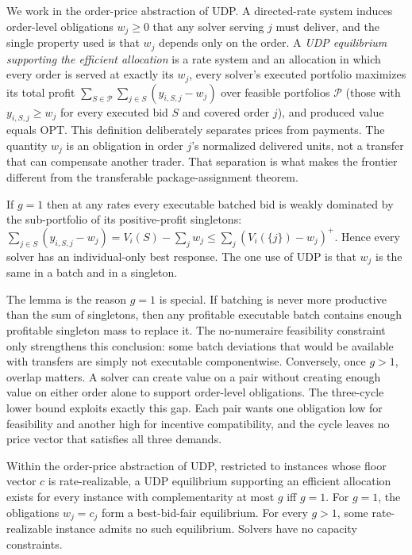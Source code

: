 \documentclass{llncs}
\newcommand{\OPT}{\mathrm{OPT}}
\begin{document}
We work in the order-price abstraction of UDP. A directed-rate system
induces order-level obligations $w_j\ge0$ that any solver serving $j$
must deliver, and the single property used is that $w_j$ depends only on
the order. A \emph{UDP equilibrium supporting the efficient allocation}
is a rate system and an allocation in which every order is served at
exactly its $w_j$, every solver's executed portfolio maximizes its
total profit
$\sum_{S\in\mathcal P}\sum_{j\in S}(y_{i,S,j}-w_j)$ over feasible
portfolios $\mathcal P$ (those with $y_{i,S,j}\ge w_j$ for every
executed bid $S$ and covered order $j$), and produced value equals
$\OPT$.
This definition deliberately separates prices from payments. The quantity $w_j$ is an
obligation in order $j$'s normalized delivered units, not a transfer that
can compensate another trader. That separation is what makes the
frontier different from the transferable package-assignment theorem.

\begin{lemma}[Batch domination under $g=1$]\label{lem:domination}
If $g=1$ then at any rates every executable batched bid is weakly
dominated by the sub-portfolio of its positive-profit singletons:
$\sum_{j\in S}(y_{i,S,j}-w_j)=V_i(S)-\sum_jw_j\le
\sum_j(V_i(\{j\})-w_j)^+$.
Hence every solver has an individual-only best response. The one use of
UDP is that $w_j$ is the same in a batch and in a singleton.
\end{lemma}

The lemma is the reason $g=1$ is special. If batching is never more
productive than the sum of singletons, then any profitable executable
batch contains enough profitable singleton mass to replace it. The
no-numeraire feasibility constraint only strengthens this conclusion:
some batch deviations that would be available with transfers are simply
not executable componentwise.
Conversely, once $g>1$, overlap matters. A solver can create value on a
pair without creating enough value on either order alone to support
order-level obligations. The three-cycle lower bound exploits exactly
this gap. Each pair wants one obligation low for feasibility and another
high for incentive compatibility, and the cycle leaves no price vector
that satisfies all three demands.

\begin{theorem}[Existence frontier is $g=1$]\label{prop:walras}
Within the order-price abstraction of UDP, restricted to instances whose
floor vector $c$ is rate-realizable, a UDP equilibrium supporting an
efficient allocation exists for every instance with complementarity at
most $g$ iff $g=1$. For $g=1$, the obligations $w_j=c_j$ form a
best-bid-fair equilibrium. For every $g>1$, some rate-realizable instance
admits no such equilibrium. Solvers have no capacity constraints.
\end{theorem}
\end{document}
